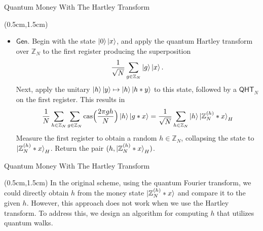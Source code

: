 \documentclass{beamer}
\theoremstyle{definition}
\newcommand{\cas}{\mathrm{cas}}
\newcommand{\qht}{\mathsf{QHT}}
\newcommand{\gen}{\mathsf{Gen}}
\begin{document}
\begin{frame}{Quantum Money With The Hartley Transform}
    
    \begin{textblock*}{12cm}(0.5cm,1.5cm)
            
        
       
        \begin{itemize}
            \item $\gen$. Begin with the state $\ket{0}\ket{x}$, and apply the quantum Hartley transform over $\mathbb{Z}_N$ to the first register producing the superposition
            \[ \frac{1}{\sqrt{N}} \sum_{g \in \mathbb{Z}_N} \ket{g}\ket{x}. \]
            Next, apply the unitary $\ket{h}\ket{y} \mapsto \ket{h}\ket{h * y}$ to this state, followed by a $\qht_N$ on the first register. This results in
            \[ \frac{1}{N} \sum_{h \in \mathbb{Z}_N} \sum_{g \in \mathbb{Z}_N} \cas\Big(\frac{2\pi gh}{N}\Big) \ket{h}\ket{g * x} = \frac{1}{\sqrt{N}} \sum_{h \in \mathbb{Z}_N} \ket{h} \ket{\mathbb{Z}_N^{(h)} * x}_H \]
            Measure the first register to obtain a random $h \in \mathbb{Z}_N$, collapsing the state to $\ket{\mathbb{Z}_N^{(h)} * x}_H$. Return the pair $(h, \ket{\mathbb{Z}_N^{(h)} * x}_H)$.

        \end{itemize}
        
       
        
    \end{textblock*}


\end{frame}





\begin{frame}{Quantum Money With The Hartley Transform}
    
    \begin{textblock*}{12cm}(0.5cm,1.5cm)
        In the original scheme, using the quantum Fourier transform, we could directly obtain $h$ from the money state $\ket{\mathbb{Z}_N^{(h)} * x}$ and compare it to the given $h$. However, this approach does not work when we use the Hartley transform. To address this, we design an algorithm for computing $h$ that utilizes quantum walks. 
        
       
        
    \end{textblock*}


\end{frame}
\end{document}

